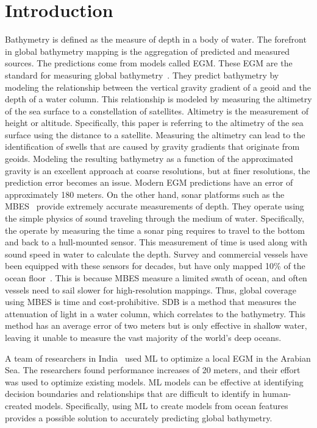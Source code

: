 \section{Introduction}
\setlength{\parindent}{10ex}
Bathymetry is defined as the measure of depth in a body of water.
The forefront in global bathymetry mapping is the aggregation of predicted and measured sources. 
The predictions come from models called \ac{EGM}.
These \acf{EGM} are the standard for measuring global bathymetry~\cite{becker2009global,smith1994bathymetric,smith1997global,smith2010planning}.
They predict bathymetry by modeling the relationship between the vertical gravity gradient of a geoid and the depth of a water column.
This relationship is modeled by measuring the altimetry of the sea surface to a constellation of satellites.
Altimetry is the measurement of height or altitude. 
Specifically, this paper is referring to the altimetry of the sea surface using the distance to a satellite.
Measuring the altimetry can lead to the identification of swells that are caused by gravity gradients that originate from geoids.
Modeling the resulting bathymetry as a function of the approximated gravity is an excellent approach at coarse resolutions, but at finer resolutions, the prediction error becomes an issue.
Modern \ac{EGM} predictions have an error of approximately 180 meters.
On the other hand, sonar platforms such as the \ac{MBES}~\cite{farr1980multibeam} provide extremely accurate measurements of depth.
They operate using the simple physics of sound traveling through the medium of water.
Specifically, the operate by measuring the time a sonar ping requires to travel to the bottom and back to a hull-mounted sensor.
This measurement of time is used along with sound speed in water to calculate the depth.
Survey and commercial vessels have been equipped with these sensors for decades, but have only mapped 10\% of the ocean floor~\cite{becker2009global}.
This is because \ac{MBES} measure a limited swath of ocean, and often vessels need to sail slower for high-resolution mappings.
Thus, global coverage using \ac{MBES} is time and cost-prohibitive.
\ac{SDB} is a method that measures the attenuation of light in a water column, which correlates to the bathymetry.
This method has an average error of two meters but is only effective in shallow water, leaving it unable to measure the vast majority of the world's deep oceans.

\par
A team of researchers in India~\cite{jena2012prediction} used \ac{ML} to optimize a local \ac{EGM} in the Arabian Sea.
The researchers found performance increases of 20 meters, and their effort was used to optimize existing models.
\ac{ML} models can be effective at identifying decision boundaries and relationships that are difficult to identify in human-created models.
Specifically, using \ac{ML} to create models from ocean features provides a possible solution to accurately predicting global bathymetry.

